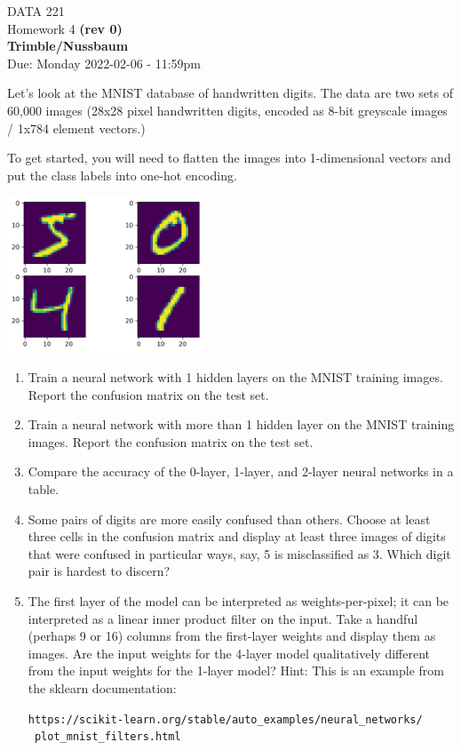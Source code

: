 \documentclass[12pt]{book}
\theoremstyle{definition}
\begin{document}
\begin{center}
{\Large DATA 221 \\  Homework 4  \textbf{(rev 0)}}\\
\textbf{Trimble/Nussbaum}\\ %
Due: Monday 2022-02-06  - 11:59pm
\end{center}

\vspace{0.2 cm}

Let's look at the MNIST database of handwritten digits.  The data are two sets of 60,000 images (28x28 pixel handwritten digits, encoded as 8-bit greyscale images / 1x784 element vectors.)

To get started, you will need to flatten the images into 1-dimensional vectors and put the class labels into one-hot encoding.

\includegraphics[width=2.3in]{src/MNIST.png}

\begin{enumerate}

\item
Train a neural network with 1 hidden layers on the MNIST training images.  Report the confusion matrix on the test set.

\item
Train a neural network with more than 1 hidden layer on the MNIST training images.  Report the confusion matrix on the test set.

\item 
Compare the accuracy of the 0-layer, 1-layer, and 2-layer neural networks in a table.

\item
Some pairs of digits are more easily confused than others.  Choose at least three cells in the confusion matrix and display at least three images of digits that were confused in particular ways,  say, 5 is misclassified as 3.   Which digit pair is hardest to discern?  

\item 
The first layer of the model can be interpreted as weights-per-pixel; it can be interpreted as a linear inner product filter on the input.   
Take a handful (perhaps 9 or 16) columns from the first-layer weights and display them as images.  Are the input weights for the 4-layer model qualitatively different from the input weights for the 1-layer model?
Hint:  This is an example from the sklearn documentation:

\texttt{https://scikit-learn.org/stable/auto\_examples/neural\_networks/ \
plot\_mnist\_filters.html}

\end{enumerate}
\end{document}
